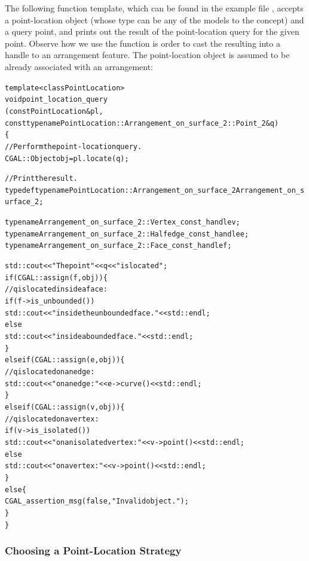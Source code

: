 The following function template, which can be found in the example
file , accepts a point-location object
(whose type can be any of the models to the
 concept) and a query point, and
prints out the result of the point-location query for the given
point. Observe how we use the function  is order
to cast the resulting  into a handle to an arrangement
feature. The point-location object  is assumed to be already
associated with an arrangement:

\begin{alltt}
template <class PointLocation>
void point_location_query
        (const PointLocation& pl,
         const typename PointLocation::Arrangement_on_surface_2::Point_2& q)
\{
  // Perform the point-location query.
  CGAL::Object obj = pl.locate (q);

  // Print the result.
  typedef typename PointLocation::Arrangement_on_surface_2  Arrangement_on_surface_2;

  typename Arrangement_on_surface_2::Vertex_const_handle    v;
  typename Arrangement_on_surface_2::Halfedge_const_handle  e;
  typename Arrangement_on_surface_2::Face_const_handle      f;

  std::cout << "The point " << q << " is located ";
  if (CGAL::assign (f, obj)) \{
    // q is located inside a face:
    if (f->is_unbounded())
      std::cout << "inside the unbounded face." << std::endl;
    else
      std::cout << "inside a bounded face." << std::endl;
  \}
  else if (CGAL::assign (e, obj)) \{
    // q is located on an edge:
    std::cout << "on an edge: " << e->curve() << std::endl;
  \}
  else if (CGAL::assign (v, obj)) \{
    // q is located on a vertex:
    if (v->is_isolated())
      std::cout << "on an isolated vertex: " << v->point() << std::endl;
    else
      std::cout << "on a vertex: " << v->point() << std::endl;
  \}
  else \{
    CGAL_assertion_msg (false, "Invalid object.");
  \}
\}
\end{alltt}

\subsubsection{Choosing a Point-Location Strategy\label{arr_sssec:pl_strat}}

